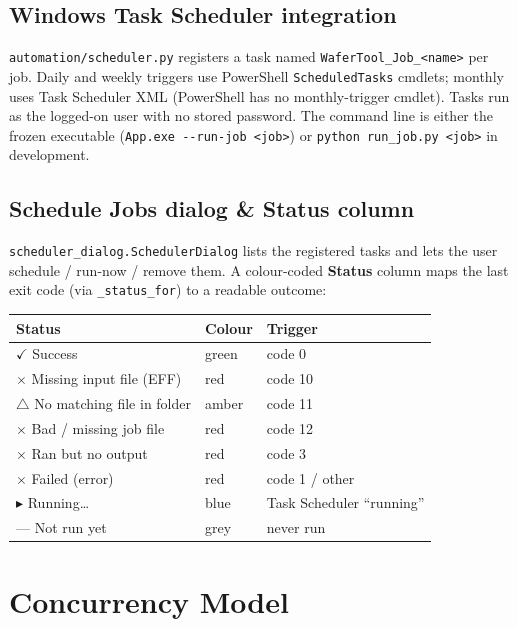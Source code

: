 \documentclass[11pt,a4paper]{report}
\newcommand{\code}[1]{\texttt{#1}}
\begin{document}
\section{Windows Task Scheduler integration}
\code{automation/scheduler.py} registers a task named \code{WaferTool\_Job\_<name>}
per job. Daily and weekly triggers use PowerShell \code{ScheduledTasks} cmdlets;
monthly uses Task Scheduler XML (PowerShell has no monthly-trigger cmdlet). Tasks
run as the logged-on user with no stored password. The command line is either the
frozen executable (\code{App.exe -{}-run-job <job>}) or
\code{python run\_job.py <job>} in development.

\section{Schedule Jobs dialog \& Status column}
\code{scheduler\_dialog.SchedulerDialog} lists the registered tasks and lets the
user schedule / run-now / remove them. A colour-coded \textbf{Status} column maps
the last exit code (via \code{\_status\_for}) to a readable outcome:

\begin{longtable}{@{}p{6.8cm}p{2.4cm}p{4.6cm}@{}}
\toprule
\textbf{Status} & \textbf{Colour} & \textbf{Trigger}\\
\midrule
\endhead
\textcolor{zgreen}{$\checkmark$ Success} & green & code 0\\
\textcolor{zred}{$\times$ Missing input file (EFF)} & red & code 10\\
\textcolor{zamber}{$\triangle$ No matching file in folder} & amber & code 11\\
\textcolor{zred}{$\times$ Bad / missing job file} & red & code 12\\
\textcolor{zred}{$\times$ Ran but no output} & red & code 3\\
\textcolor{zred}{$\times$ Failed (error)} & red & code 1 / other\\
$\blacktriangleright$ Running\ldots & blue & Task Scheduler ``running''\\
--- Not run yet & grey & never run\\
\bottomrule
\end{longtable}

\chapter{Concurrency Model}\label{ch:concurrency}
\end{document}
